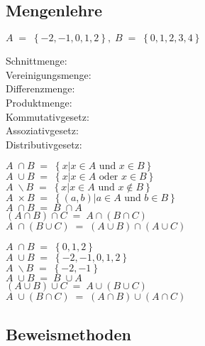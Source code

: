 \subsection{Mengenlehre}
	$A \;=\; \left\{-2,-1,0,1,2\right\} ,\; B\; =\; \left\{0,1,2,3,4\right\}$\\
	\begin{minipage}[c]{6.5cm}
		Schnittmenge:\\
		Vereinigungsmenge:\\
		Differenzmenge:\\
		Produktmenge:\\
		Kommutativgesetz:\\
		Assoziativgesetz:\\
		Distributivgesetz:
	\end{minipage}
	\begin{minipage}[c]{6.5cm}
		$A \; \cap  B \;=\;\left\{x|x \in A \text{ und } x \in B \right\}$\\
		$A \; \cup  B \;=\;\left\{x|x \in A \text{ oder } x \in B \right\}$\\			
		$A \; \smallsetminus B \;=\;\left\{x|x \in A \text{ und } x \notin B \right\}$\\
		$A \; \times B\;=\;\left\{(a,b)|a \in A \text{ und } b \in B \right\}$\\
		$A \; \cap  B \;=\;B \; \cap A$ \\
		$\left(A \cap  B \right) \cap C\;=\;A \cap \left( B \cap C \right)$ \\
		$A\; \cap \left(B\cup C\right)\;=\;\left(A \cup B\right)\cap \left(A \cup C\right) $ 
	\end{minipage}
	\begin{minipage}[c]{7cm}
		$A \; \cap B \;=\; \left\{0,1,2\right\}$\\
		$A \; \cup  B \;=\;\left\{-2,-1,0,1,2\right\}$\\
		$A \; \smallsetminus B \;=\;\left\{-2,-1\right\}$\\
		$ $\\
		$A \; \cup  B \;=\;B \; \cup A$ \\
		$\left(A \cup  B\right) \cup C\;=\;A \cup \left( B \cup C \right)$ \\
		$A\; \cup \left( B \cap C \right)\;=\;\left( A \cap  B \right) \cup \left(A \cap  C\right) $
	\end{minipage}
	
\subsection{Beweismethoden}

